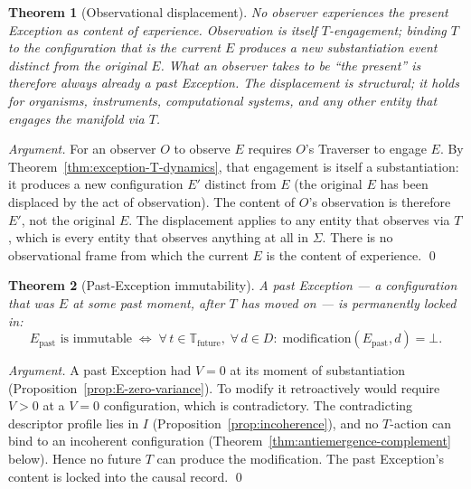 \documentclass[11pt,a4paper]{article}
\newtheorem{theorem}{Theorem}[section]
\theoremstyle{definition}
\theoremstyle{remark}
\begin{document}
\begin{theorem}[Observational displacement]\label{thm:observational-displacement}
No observer experiences the present Exception as content of experience. Observation is itself $T$-engagement; binding $T$ to the configuration that is the current $E$ produces a new substantiation event distinct from the original $E$. What an observer takes to be ``the present'' is therefore always already a past Exception. The displacement is structural; it holds for organisms, instruments, computational systems, and any other entity that engages the manifold via $T$.
\end{theorem}

\begin{proof}[Argument]
For an observer $O$ to observe $E$ requires $O$'s Traverser to engage $E$. By Theorem~\ref{thm:exception-T-dynamics}, that engagement is itself a substantiation: it produces a new configuration $E'$ distinct from $E$ (the original $E$ has been displaced by the act of observation). The content of $O$'s observation is therefore $E'$, not the original $E$. The displacement applies to any entity that observes via $T$, which is every entity that observes anything at all in $\Sigma$. There is no observational frame from which the current $E$ is the content of experience. \qed
\end{proof}

\begin{theorem}[Past-Exception immutability]\label{thm:past-immutability}
A past Exception --- a configuration that was $E$ at some past moment, after $T$ has moved on --- is permanently locked in:
\[
E_{\mathrm{past}} \text{ is immutable} \;\Longleftrightarrow\; \forall\, t \in \mathbb{T}_{\mathrm{future}},\;\forall\, d \in D :\; \mathrm{modification}(E_{\mathrm{past}}, d) = \bot.
\]
\end{theorem}

\begin{proof}[Argument]
A past Exception had $V = 0$ at its moment of substantiation (Proposition~\ref{prop:E-zero-variance}). To modify it retroactively would require $V > 0$ at a $V = 0$ configuration, which is contradictory. The contradicting descriptor profile lies in $I$ (Proposition~\ref{prop:incoherence}), and no $T$-action can bind to an incoherent configuration (Theorem~\ref{thm:antiemergence-complement} below). Hence no future $T$ can produce the modification. The past Exception's content is locked into the causal record. \qed
\end{proof}
\end{document}
